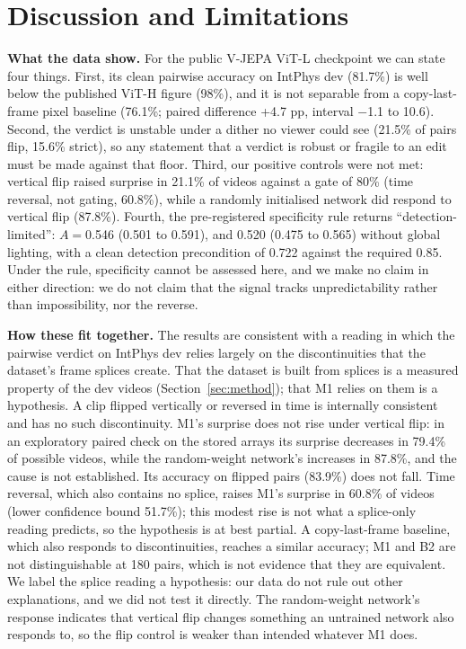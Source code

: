 \section{Discussion and Limitations}
\label{sec:discussion}
\textbf{What the data show.} For the public V-JEPA ViT-L checkpoint we can state four things. First, its clean pairwise accuracy on IntPhys dev (81.7\%) is well below the published ViT-H figure (98\%), and it is not separable from a copy-last-frame pixel baseline (76.1\%; paired difference +4.7 pp, interval $-$1.1 to 10.6). Second, the verdict is unstable under a dither no viewer could see (21.5\% of pairs flip, 15.6\% strict), so any statement that a verdict is robust or fragile to an edit must be made against that floor. Third, our positive controls were not met: vertical flip raised surprise in 21.1\% of videos against a gate of 80\% (time reversal, not gating, 60.8\%), while a randomly initialised network did respond to vertical flip (87.8\%). Fourth, the pre-registered specificity rule returns ``detection-limited'': $A=$0.546 (0.501 to 0.591), and 0.520 (0.475 to 0.565) without global lighting, with a clean detection precondition of 0.722 against the required 0.85. Under the rule, specificity cannot be assessed here, and we make no claim in either direction: we do not claim that the signal tracks unpredictability rather than impossibility, nor the reverse.

\textbf{How these fit together.} The results are consistent with a reading in which the pairwise verdict on IntPhys dev relies largely on the discontinuities that the dataset's frame splices create. That the dataset is built from splices is a measured property of the dev videos (Section~\ref{sec:method}); that M1 relies on them is a hypothesis. A clip flipped vertically or reversed in time is internally consistent and has no such discontinuity. M1's surprise does not rise under vertical flip: in an exploratory paired check on the stored arrays its surprise decreases in 79.4\% of possible videos, while the random-weight network's increases in 87.8\%, and the cause is not established. Its accuracy on flipped pairs (83.9\%) does not fall. Time reversal, which also contains no splice, raises M1's surprise in 60.8\% of videos (lower confidence bound 51.7\%); this modest rise is not what a splice-only reading predicts, so the hypothesis is at best partial. A copy-last-frame baseline, which also responds to discontinuities, reaches a similar accuracy; M1 and B2 are not distinguishable at 180 pairs, which is not evidence that they are equivalent. We label the splice reading a hypothesis: our data do not rule out other explanations, and we did not test it directly. The random-weight network's response indicates that vertical flip changes something an untrained network also responds to, so the flip control is weaker than intended whatever M1 does.

